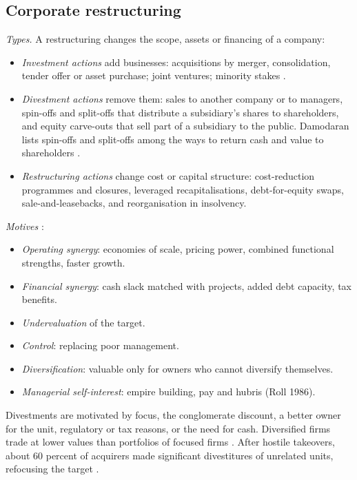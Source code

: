 \subsection{Corporate restructuring}

\begin{qfmethod}\label{meth:restructuring-evaluation}
 \emph{Types.} A restructuring changes the scope, assets or financing of a company:
\begin{itemize}
\item \emph{Investment actions} add businesses: acquisitions by merger, consolidation, tender offer or asset purchase; joint ventures; minority stakes \citep[pp.~702--704]{investment-valuation-2012}.
\item \emph{Divestment actions} remove them: sales to another company or to managers, spin-offs and split-offs that distribute a subsidiary's shares to shareholders, and equity carve-outs that sell part of a subsidiary to the public. Damodaran lists spin-offs and split-offs among the ways to return cash and value to shareholders \citep[pp.~437--438]{applied-corporate-finance-2014}.
\item \emph{Restructuring actions} change cost or capital structure: cost-reduction programmes and closures, leveraged recapitalisations, debt-for-equity swaps, sale-and-leasebacks, and reorganisation in insolvency.
\end{itemize}

\emph{Motives} \citep[pp.~706--710]{investment-valuation-2012}:
\begin{itemize}
\item \emph{Operating synergy}: economies of scale, pricing power, combined functional strengths, faster growth.
\item \emph{Financial synergy}: cash slack matched with projects, added debt capacity, tax benefits.
\item \emph{Undervaluation} of the target.
\item \emph{Control}: replacing poor management.
\item \emph{Diversification}: valuable only for owners who cannot diversify themselves.
\item \emph{Managerial self-interest}: empire building, pay and hubris (Roll 1986).
\end{itemize}
Divestments are motivated by focus, the conglomerate discount, a better owner for the unit, regulatory or tax reasons, or the need for cash. Diversified firms trade at lower values than portfolios of focused firms \citep[pp.~2--3]{lang-stulz-1993}. After hostile takeovers, about 60 percent of acquirers made significant divestitures of unrelated units, refocusing the target \citep[pp.~709--710]{investment-valuation-2012}.


\end{qfmethod}
